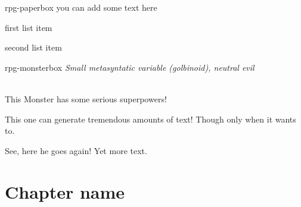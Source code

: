 \documentclass[10pt,twoside,twocolumn]{book}
\begin{document}
\begin{rpg-paperbox}{rpg-paperbox}
	you can add some text here
\end{rpg-paperbox}

\begin{rpg-list}
    \item first list item
    \item second list item
\end{rpg-list}
\begin{rpg-monsterbox}{rpg-monsterbox}
	\textit{Small metasyntatic variable (golbinoid), neutral evil}\\
	\rpghline
	\basics[%
	armorclass = 12,
	hitpoints  = 16 (3d8 + 3),
	speed      = 50 t
	]
	\rpghline
	\stats[ %
    STR = 12, 
    DEX = 7
	]
	\rpghline
	\details[%
	languages = {Common Lisp, Erlang},
	]
	\rpghline \\[1mm]
	\begin{rpg-monsteraction}
		This Monster has some serious superpowers!
	\end{rpg-monsteraction}

	\begin{rpg-monsteraction}
		This one can generate tremendous amounts of text! Though only when it wants to.
	\end{rpg-monsteraction}

	\begin{rpg-monsteraction}
    See, here he goes again! Yet more text.
	\end{rpg-monsteraction}
\end{rpg-monsterbox}

\chapter{Chapter name}

\end{document}
